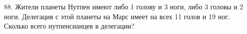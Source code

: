 88. Жители планеты Нутпен имеют либо 1 голову и 3 ноги, либо 3 головы и 2 ноги. Делегация с этой планеты на Марс имеет на всех 11 голов и 19 ног. Сколько всего нутпенсианцев в делегации?\\
